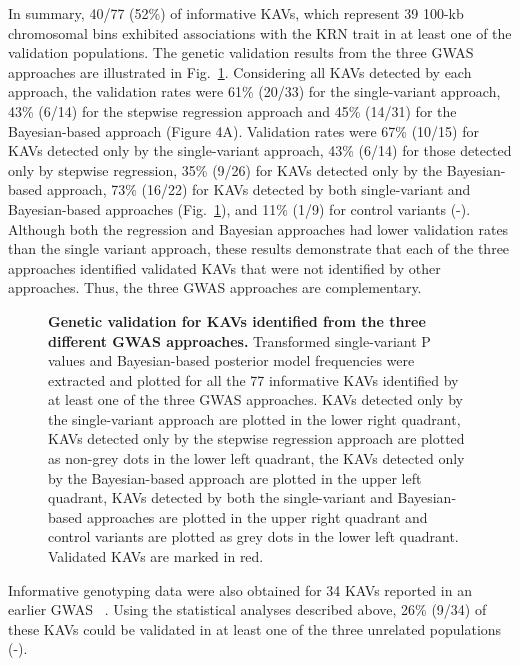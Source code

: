 \documentclass[10pt,letterpaper]{article}
\begin{document}
In summary, 40/77 (52\%) of informative KAVs, which represent 39 100-kb chromosomal bins exhibited associations with the KRN trait in at least one of the validation populations. The genetic validation results from the three GWAS approaches are illustrated in Fig.~\ref{fig4}. Considering all KAVs detected by each approach, the validation rates were 61\% (20/33) for the single-variant approach, 43\% (6/14) for the stepwise regression approach and 45\% (14/31) for the Bayesian-based approach (Figure 4A). Validation rates were 67\% (10/15) for KAVs detected only by the single-variant approach, 43\% (6/14) for those detected only by stepwise regression, 35\% (9/26) for KAVs detected only by the Bayesian-based approach, 73\% (16/22) for KAVs detected by both single-variant and Bayesian-based approaches (Fig.~\ref{fig4}), and 11\% (1/9) for control variants (-). Although both the regression and Bayesian approaches had lower validation rates than the single variant approach, these results demonstrate that each of the three approaches identified validated KAVs that were not identified by other approaches. Thus, the three GWAS approaches are complementary. 

\begin{figure}[h]
\caption{{\bf Genetic validation for KAVs identified from the three different GWAS approaches.}
Transformed single-variant P values and Bayesian-based posterior model frequencies were extracted and plotted for all the 77 informative KAVs identified by at least one of the three GWAS approaches. KAVs detected only by the single-variant approach are plotted in the lower right quadrant, KAVs detected only by the stepwise regression approach are plotted as non-grey dots in the lower left quadrant, the KAVs detected only by the Bayesian-based approach are plotted in the upper left quadrant, KAVs detected by both the single-variant and Bayesian-based approaches are plotted in the upper right quadrant and control variants are plotted as grey dots in the lower left quadrant. Validated KAVs are marked in red.}
\label{fig4}
\end{figure}

Informative genotyping data were also obtained for 34 KAVs reported in an earlier GWAS ~\cite{Brown2011}. Using the statistical analyses described above, 26\% (9/34) of these KAVs could be validated in at least one of the three unrelated populations (-).
\end{document}
